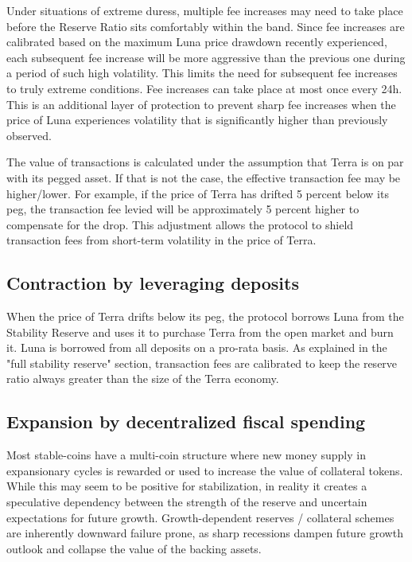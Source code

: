 \documentclass{article}
\begin{document}
Under situations of extreme duress, multiple fee increases may need to take place before the Reserve Ratio sits comfortably within the band. Since fee increases are calibrated based on the maximum Luna price drawdown recently experienced, each subsequent fee increase will be more aggressive than the previous one during a period of such high volatility. This limits the need for subsequent fee increases to truly extreme conditions. Fee increases can take place at most once every 24h. This is an additional layer of protection to prevent sharp fee increases when the price of Luna experiences volatility that is significantly higher than previously observed.

The value of transactions is calculated under the assumption that Terra is on par with its pegged asset. If that is not the case, the effective transaction fee may be higher/lower. For example, if the price of Terra has drifted 5 percent below its peg, the transaction fee levied will be approximately 5 percent higher to compensate for the drop. This adjustment allows the protocol to shield transaction fees from short-term volatility in the price of Terra.



\subsection{Contraction by leveraging deposits}

When the price of Terra drifts below its peg, the protocol borrows Luna from the Stability Reserve and uses it to purchase Terra from the open market and burn it. Luna is borrowed from all deposits on a pro-rata basis. As explained in the "full stability reserve" section, transaction fees are calibrated to keep the reserve ratio always greater than the size of the Terra economy. 

\subsection{Expansion by decentralized fiscal spending}

Most stable-coins have a multi-coin structure where new money supply in expansionary cycles is rewarded or used to increase the value of collateral tokens. While this may seem to be positive for stabilization, in reality it creates a speculative dependency between the strength of the reserve and uncertain expectations for future growth. Growth-dependent reserves / collateral schemes are inherently downward failure prone, as sharp recessions dampen future growth outlook and collapse the value of the backing assets. 
\end{document}

